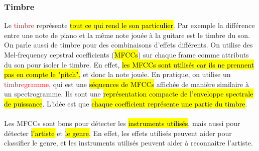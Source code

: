 \documentclass[letterpaper, 12pt]{article}
\newcommand{\alinea}{
\hspace*{0.5cm}}
\newcommand{\red}[1]{
	\textcolor{red}{#1}}
\begin{document}
			\subsubsection{Timbre}
				\alinea Le \red{timbre} représente \hl{tout ce qui rend le son particulier}. Par exemple la différence entre une note 
					de piano et la même note jouée à la guitare est le timbre du son. On parle aussi de timbre pour des combinaisons 
					d'effets différents. On utilise des Mel-frequency cepstral coefficients (\hl{MFCCs}) sur chaque frame comme attributs 
					du son pour isoler le timbre. En effet, \hl{les MFCCs sont utilisés car ils ne prennent pas en compte le "pitch"}, 
					et donc la note jouée. En pratique, on
					utilise un \red{timbregramme}, qui est une \hl{séquences de MFCCs} affichée de manière similaire à un spectrogramme. 
					Ils sont une \hl{représentation compacte de l'enveloppe spectrale de puissance}. L'idée est que \hl{chaque coefficient 
					représente une partie du timbre}.\\
				~\\
				\alinea Les MFCCs sont bons pour détecter les \hl{instruments utilisés}, mais aussi pour détecter \hl{l'artiste} et 
					\hl{le genre}. En effet, les effets utilisés peuvent aider pour classifier le genre, et les instruments utilisés 
					peuvent aider à reconnaitre l'artiste.
\end{document}
